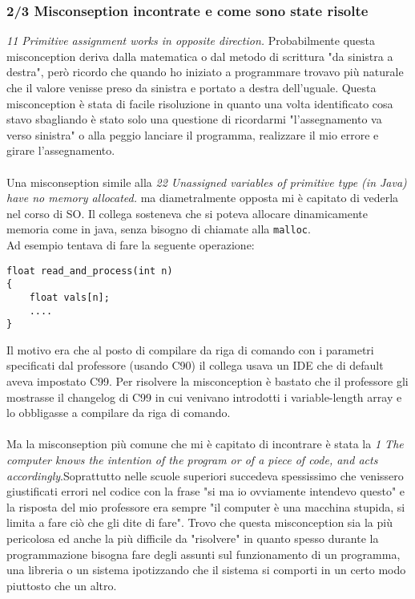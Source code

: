 \documentclass[a4paper]{article}
\begin{document}
\subsubsection{2/3 Misconseption incontrate e come sono state risolte}
\textit{11 Primitive assignment works in opposite direction.}
Probabilmente questa misconception deriva dalla matematica o dal metodo di scrittura "da sinistra a destra", però ricordo che quando ho iniziato a programmare trovavo più naturale che il valore venisse preso da sinistra e portato a destra dell'uguale.
Questa misconception è stata di facile risoluzione in quanto una volta identificato cosa stavo sbagliando è stato solo una questione di ricordarmi "l'assegnamento va verso sinistra" o alla peggio lanciare il programma, realizzare il mio errore e girare l'assegnamento.\\\\
Una misconseption simile alla \textit{22 Unassigned variables of primitive type (in Java) have no memory allocated.} ma diametralmente opposta mi è capitato di vederla nel corso di SO. Il collega sosteneva che si poteva allocare dinamicamente memoria come in java, senza bisogno di chiamate alla \texttt{malloc}.\\
Ad esempio tentava di fare la seguente operazione:
\begin{lstlisting}
float read_and_process(int n)
{
    float vals[n];
    ....
}
\end{lstlisting}
Il motivo era che al posto di compilare da riga di comando con i parametri specificati dal professore (usando C90) il collega usava un IDE che di default aveva impostato C99. Per risolvere la misconception è bastato che il professore gli mostrasse il changelog di C99 in cui venivano introdotti i variable-length array e lo obbligasse a compilare da riga di comando.\\\\
Ma la misconseption più comune che mi è capitato di incontrare è stata la \textit{1 The computer knows the intention of the program or of a piece of code, and acts accordingly}.Soprattutto nelle scuole superiori succedeva spessissimo che venissero giustificati errori nel codice con la frase "si ma io ovviamente intendevo questo" e la risposta del mio professore era sempre "il computer è una macchina stupida, si limita a fare ciò che gli dite di fare".
Trovo che questa misconception sia la più pericolosa ed anche la più difficile da "risolvere" in quanto spesso durante la programmazione bisogna fare degli assunti sul funzionamento di un programma, una libreria o un sistema ipotizzando che il sistema si comporti in un certo modo piuttosto che un altro.
\end{document}
